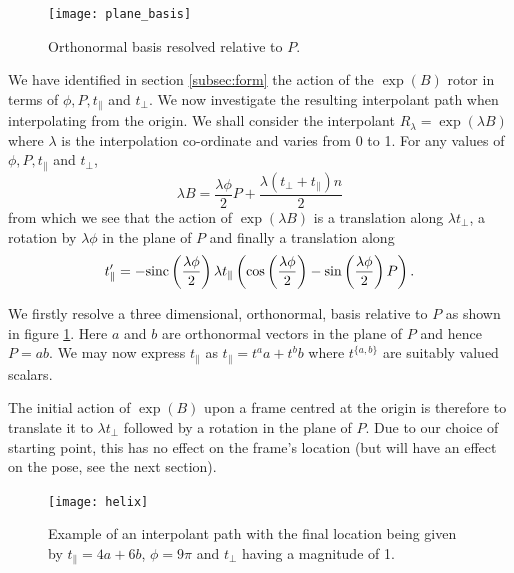 \begin{figure}\centering
\texttt{[image: plane\_basis]}
\caption{\label{fig:plane_basis}Orthonormal basis resolved relative to $P$.}
\end{figure}

We have identified in section \ref{subsec:form} the action of the $\exp(B)$
rotor in terms of $\phi, P, t_\parallel$ and $t_\perp$. We now investigate the resulting interpolant
path when interpolating from the origin. We shall consider the interpolant
$R_\lambda = \exp(\lambda B)$ where $\lambda$ is the interpolation co-ordinate and
varies from 0 to 1. For any values of $\phi, P, t_\parallel$ and $t_\perp$,
\[
\lambda B = \frac{\lambda \phi}{2} P + \frac{\lambda (t_\perp + t_\parallel) n}{2}
\]
from which we see that the action of $\exp(\lambda B)$ is a translation along $\lambda t_\perp$, a rotation by
$\lambda \phi$ in the plane of $P$ and finally a translation along
\[
t'_\parallel =- \mathrm{sinc}\left(\frac{\lambda\phi}{2}\right)
\lambda t_\parallel
\left(
\cos\left(\frac{\lambda \phi}{2}\right) -
\sin\left(\frac{\lambda \phi}{2}\right) P 
\right).
\]

We firstly resolve a three dimensional, orthonormal, basis relative to $P$ as shown in figure 
\ref{fig:plane_basis}. Here $a$ and $b$ are orthonormal vectors in the plane of $P$ and hence
$P = ab$. We may now express $t_\parallel$ as $t_\parallel = t^a a + t^b b$ where $t^{\{a,b\}}$ are suitably
valued scalars.

The initial action of $\exp(B)$ upon a frame centred at the origin is therefore to 
translate it to $\lambda t_\perp$ followed by a rotation in the plane of $P$. Due to our choice of starting
point, this has no effect on the frame's location (but will have an effect on the pose, 
see the next section).


\begin{figure}\centering
\texttt{[image: helix]}
\caption{\label{fig:helix} Example of an interpolant path with the final location being given by
$t_\parallel = 4a + 6b$, $\phi = 9\pi$ and $t_\perp$ having a magnitude of 1.}
\end{figure}

